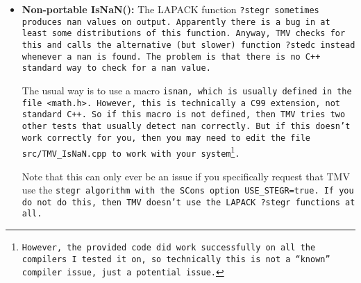 \begin{itemize}
\item {\bf Non-portable IsNaN():}
The LAPACK function \tt{?stegr} sometimes produces \tt{nan} values on output.
Apparently there is a bug in at least some distributions of this function.
Anyway, TMV checks for this and calls the alternative (but slower) function
\tt{?stedc} instead whenever a \tt{nan} is found.  
The problem is that there is no C++ standard way to check
for a \tt{nan} value.  

The usual way is to use a macro \tt{isnan}, which is usually
defined in the file \tt{<math.h>}.  However, this is technically a C99 extension,
not standard C++.  So if this macro is not defined, then TMV tries two other
tests that usually detect \tt{nan} correctly.  But if this doesn't work correctly
for you, then you may need to edit the file \texttt{src/TMV\_IsNaN.cpp} to work
with your system\footnote{
However, the provided code did work successfully on all the compilers I 
tested it on, so technically this is not a ``known'' compiler issue, just a 
potential issue.}.

Note that this can only ever be an issue if you specifically request that TMV use the \tt{stegr} algorithm with the SCons option \tt{USE_STEGR=true}.  If you do not do this, then TMV doesn't use the LAPACK \tt{?stegr} functions at all.

\end{itemize}

